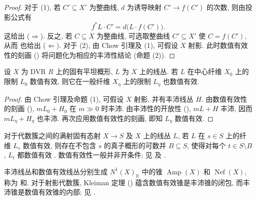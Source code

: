 \begin{proof}
对于 (1), 若 $C'\subseteq X'$ 为整曲线, $d$ 为诱导映射 $C'\to f(C')$ 的次数, 则由投影公式有
\begin{equation}\label{src:B.2.16}
f^*L\cdot C'=d\bigl(L\cdot f(C')\bigr).
\end{equation}
这给出 ($\Rightarrow$). 反之, 若 $C\subseteq X$ 为整曲线, 可选取整曲线 $C'\subseteq X'$ 使 $C=f(C')$, 从而  也给出 ($\Leftarrow$). 对于 (2), 由 Chow 引理及 (1), 可假设 $X$ 射影. 此时数值有效性的刻画 () 将问题化为相应的丰沛性结论 (命题 (2)).
\end{proof}
\begin{proposition}[数值有效性在一般化下稳定]\label{src:B.2.17}
设 $X$ 为 DVR $R$ 上的固有平坦概形, $L$ 为 $X$ 上的线丛. 若 $L$ 在中心纤维 $X_0$ 上的限制 $L_0$ 数值有效, 则它在一般纤维 $X_\eta$ 上的限制 $L_\eta$ 也数值有效.
\end{proposition}
\begin{proof}
由 Chow 引理及命题 (1), 可假设 $X$ 射影, 并有丰沛线丛 $H$. 由数值有效性的刻画 (), $mL_0+H_0$ 在 $m\gg0$ 时丰沛. 由丰沛性的开放性 (), $mL+H$ 丰沛, 因而 $mL_\eta+H_\eta$ 也丰沛. 再次应用数值有效性的刻画, 即知 $L_\eta$ 数值有效.
\end{proof}
\begin{remark}\label{src:B.2.18}
对于代数簇之间的满射固有态射 $X\to S$ 及 $X$ 上的线丛 $L$, 若 $L$ 在 $s\in S$ 上的纤维 $L_s$ 数值有效, 则存在不包含 $s$ 的真子概形的可数并 $B\subseteq S$, 使得对每个 $t\in S\setminus B$, $L_t$ 都数值有效 \cite[命题 $1.4.14$]{Laz04a}. 数值有效性一般并非开条件; 见 \cite[例 $5.3$]{Lan13} 及 \cite[定理 $1.2$]{Les14}.
\end{remark}
\begin{remark}[丰沛锥与数值有效锥]\label{src:B.2.19}
丰沛线丛和数值有效线丛分别生成 $N^1(X)_{\mathbb R}$ 中的锥 $\operatorname{Amp}(X)$ 和 $\operatorname{Nef}(X)$, 称为 和. 对于射影代数簇, Kleiman 定理 () 蕴含数值有效锥是丰沛锥的闭包, 而丰沛锥是数值有效锥的内部; 见 \cite[定理 $1.4.23$]{Laz04a}.
\end{remark}

